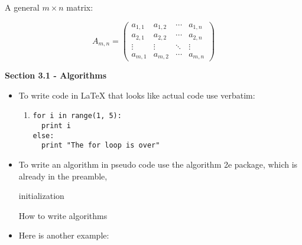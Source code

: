 \documentclass[11pt]{article}
\begin{document}
A general $m \times n$ matrix:

$$
A_{m,n} =
 \begin{pmatrix}
  a_{1,1} & a_{1,2} & \cdots & a_{1,n} \\
  a_{2,1} & a_{2,2} & \cdots & a_{2,n} \\
  \vdots  & \vdots  & \ddots & \vdots  \\
  a_{m,1} & a_{m,2} & \cdots & a_{m,n}
 \end{pmatrix}
$$


\newpage




{\large\textbf{Section 3.1 - Algorithms}}

\begin{itemize}

\item To write code in LaTeX that looks like actual code use verbatim:

\begin{enumerate}
\item[] \begin{verbatim}
for i in range(1, 5):
  print i
else:
  print "The for loop is over"
\end{verbatim}
\end{enumerate}

\item To write an algorithm in pseudo code use the algorithm 2e package, which is already in the preamble,\\

\begin{algorithm}[H]
 \SetAlgoLined
 initialization\;
 \caption{How to write algorithms}
\end{algorithm}

\vspace{0.3cm}

\item Here is another example:\\


\end{itemize}
\end{document}
